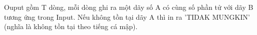 Ouput gồm T dòng, mỗi dòng ghi ra một dãy số A có cùng số phần tử với dãy B tương ứng trong Input. Nếu không tồn tại dãy A thì in ra 'TIDAK MUNGKIN' (nghĩa là không tồn tại theo tiếng cá mập).